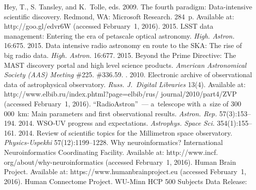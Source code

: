   \begin{multicols}{2}

\renewcommand{\bibname}{\protect\rmfamily References}

{\small\frenchspacing
 {%
 \begin{thebibliography}{99}
{Hey, T., S. Tansley, and K.~Tolle}, eds. 2009. The fourth paradigm: Data-intensive scientific discovery. 
Redmond, WA: Microsoft Research. 284~p.
Available at: {\sf http://goo.gl/edvr6W} (accessed February~1, 2016).
 2015. LSST data management: Entering the era of petascale optical astronomy. 
\textit{High. Astron.} 16:675.
 2015. Data intensive radio astronomy en route to the SKA: The rise of big radio data. 
\textit{High. Astron.} 16:677.
 2015. Beyond the Prime Directive: The MAST 
discovery portal and high level science products.
\textit{American Astronomical Society (AAS) Meeting} \#225. 
\#336.59.
. 2010. Electronic archive of observational data of 
astrophysical observatory. \textit{Russ. J.~Digital Libraries} 13(4). Available at: {\sf 
http://www.elbib.ru/index.phtml?page=elbib/rus/ journal/2010/part4/ZVP} 
(accessed February~1, 2016).
``RadioAstron''~--- a~telescope with 
a~size of 300\,000~km: Main parameters and first observational results. \textit{Astron. Rep.} 57(3):153--194.
 2014. WSO-UV progress and 
expectations. \textit{Astrophys. Space Sci.} 354(1):155--161.
 2014. Review of scientific topics for the Millimetron space observatory. \textit{Physics-Uspekhi} 
57(12):1199--1228.
Why neuroinformatics? International Neuroinformatics Coordinating Facility. Available at: {\sf 
http://www.incf. org/about/why-neuroinformatics} (accessed February~1, 2016).
Human Brain Project. Available at: {\sf https://www.\linebreak humanbrainproject.eu} (accessed February~1, 2016).
Human Connectome Project. WU-Minn HCP 500 Subjects Data Release: 

\end{thebibliography}}}
\end{multicols}
